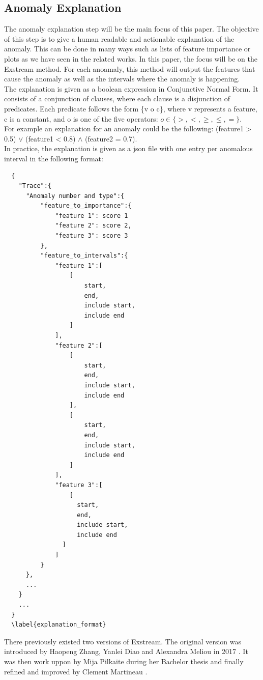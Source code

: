 \documentclass[oneside, a4paper, onecolumn, 11pt]{article}
\begin{document}
\subsection{Anomaly Explanation}
The anomaly explanation step will be the main focus of this paper. The objective of this step is to give a human readable and actionable explanation of the anomaly. This can be done in many ways such as lists of feature importance or plots as we have seen in the related works. In this paper, the focus will be on the Exstream method. For each anoamaly, this method will output the features that cause the anomaly as well as the intervals where the anomaly is happening.\\
The explanation is given as a boolean expression in Conjunctive Normal Form. It consists of a conjunction of clauses, where each clause is a disjunction of predicates. Each predicate follows the form \{v o c\}, where v represents a feature, c is a constant, and o is one of the five operators: $o\in\{>, <, \geq, \leq, =\}$.\\
For example an explanation for an anomaly could be the following: (feature1 > 0.5) $\lor$ (feature1 < 0.8) $\land$ (feature2 = 0.7).\\
In practice, the explanation is given as a json file with one entry per anomalous interval in the following format:
\begin{verbatim}
  {
    "Trace":{
      "Anomaly number and type":{
          "feature_to_importance":{
              "feature 1": score 1
              "feature 2": score 2,
              "feature 3": score 3
          },
          "feature_to_intervals":{
              "feature 1":[
                  [
                      start,
                      end,
                      include start,
                      include end
                  ]
              ],
              "feature 2":[
                  [
                      start,
                      end,
                      include start,
                      include end
                  ],
                  [
                      start,
                      end,
                      include start,
                      include end
                  ]
              ],
              "feature 3":[
                  [
                    start,
                    end,
                    include start,
                    include end
                ]
              ]
          }
      },
      ...
    }
    ...
  }
  \label{explanation_format}
\end{verbatim}
There previously existed two versions of Exstream. The original version was introduced by Haopeng Zhang, Yanlei Diao and Alexandra Meliou  in 2017 \cite{Exstream}. It was then work uppon by Mija Pilkaite during her Bachelor thesis \cite{MijaExstream} and finally refined and improved by Clement Martineau \cite{ClementExstream}.\\
\end{document}
